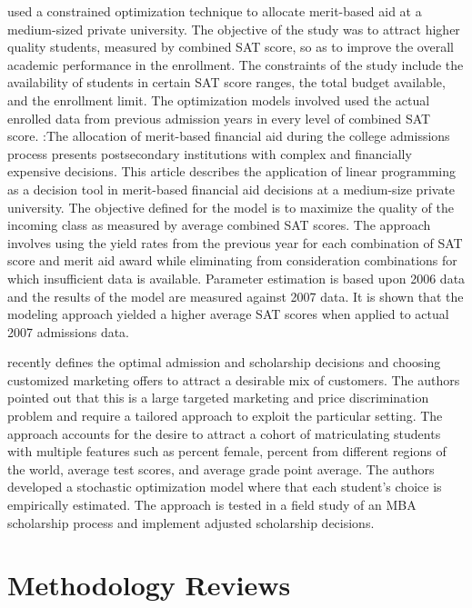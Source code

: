\documentclass[12pt,english]{report}
\begin{document}
\citet{Sugrue2010} used a constrained optimization technique to allocate
merit-based aid at a medium-sized private university. The objective of the
study was to attract higher quality students, measured by combined SAT score,
so as to improve the overall academic performance in the enrollment. The
constraints of the study include the availability of students in certain SAT
score ranges, the total budget available, and the enrollment limit.  The
optimization models involved used the actual enrolled data from previous
admission years in every level of combined SAT score.  \citet{Sugrue2010}:The
allocation of merit-based financial aid during the college admissions process
presents postsecondary institutions with complex and financially expensive
decisions. This article describes the application of linear programming as a
decision tool in merit-based financial aid decisions at a medium-size private
university. The objective defined for the model is to maximize the quality of
the incoming class as measured by average combined SAT scores. The approach
involves using the yield rates from the previous year for each combination of
SAT score and merit aid award while eliminating from consideration combinations
for which insufficient data is available. Parameter estimation is based upon
2006 data and the results of the model are measured against 2007 data. It is
shown that the modeling approach yielded a higher average SAT scores when
applied to actual 2007 admissions data.

\citet{Belloni2012} recently defines the optimal admission and scholarship
decisions and choosing customized marketing offers to attract a desirable mix
of customers.  The authors pointed out that this is a large targeted marketing
and price discrimination problem and require a tailored approach to exploit the
particular setting.  The approach accounts for the
desire to attract a cohort of matriculating students with multiple features
such as percent female, percent from different regions of the world, average
test scores, and average grade point average.   The authors developed a
stochastic optimization model where that each student's choice is empirically
estimated. The approach is tested in a field study of an MBA scholarship
process and implement adjusted scholarship decisions.
\section{Methodology Reviews}
\end{document}
